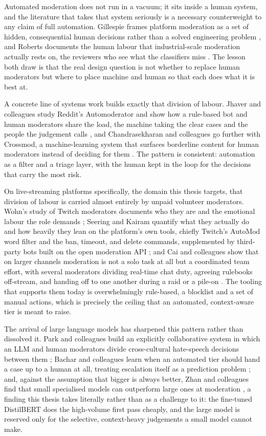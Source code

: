 Automated moderation does not run in a vacuum; it sits inside a human system, and the literature that takes that system seriously is a necessary counterweight to any claim of full automation. Gillespie frames platform moderation as a set of hidden, consequential human decisions rather than a solved engineering problem \citep{gillespie2018custodians}, and Roberts documents the human labour that industrial-scale moderation actually rests on, the reviewers who see what the classifiers miss \citep{roberts2019behindscreen}. The lesson both draw is that the real design question is not whether to replace human moderators but where to place machine and human so that each does what it is best at.

A concrete line of systems work builds exactly that division of labour. Jhaver and colleagues study Reddit's Automoderator and show how a rule-based bot and human moderators share the load, the machine taking the clear cases and the people the judgement calls \citep{jhaver2019automod}, and Chandrasekharan and colleagues go further with Crossmod, a machine-learning system that surfaces borderline content for human moderators instead of deciding for them \citep{chandrasekharan2019crossmod}. The pattern is consistent: automation as a filter and a triage layer, with the human kept in the loop for the decisions that carry the most risk.

On live-streaming platforms specifically, the domain this thesis targets, that division of labour is carried almost entirely by unpaid volunteer moderators. Wohn's study of Twitch moderators documents who they are and the emotional labour the role demands \citep{wohn2019volunteer}; Seering and Kairam quantify what they actually do and how heavily they lean on the platform's own tools, chiefly Twitch's AutoMod word filter and the ban, timeout, and delete commands, supplemented by third-party bots built on the open moderation API \citep{seering2023who}; and Cai and colleagues show that on larger channels moderation is not a solo task at all but a coordinated team effort, with several moderators dividing real-time chat duty, agreeing rulebooks off-stream, and handing off to one another during a raid or a pile-on \citep{cai2022coordination}. The tooling that supports them today is overwhelmingly rule-based, a blocklist and a set of manual actions, which is precisely the ceiling that an automated, context-aware tier is meant to raise.

The arrival of large language models has sharpened this pattern rather than dissolved it. Park and colleagues build an explicitly collaborative system in which an LLM and human moderators divide cross-cultural hate-speech decisions between them \citep{llmc3mod2025}; Bachar and colleagues learn when an automated tier should hand a case up to a human at all, treating escalation itself as a prediction problem \citep{escalate2026}; and, against the assumption that bigger is always better, Zhan and colleagues find that small specialised models can outperform large ones at moderation \citep{slmmod2024}, a finding this thesis takes literally rather than as a challenge to it: the fine-tuned DistilBERT does the high-volume first pass cheaply, and the large model is reserved only for the selective, context-heavy judgements a small model cannot make.

